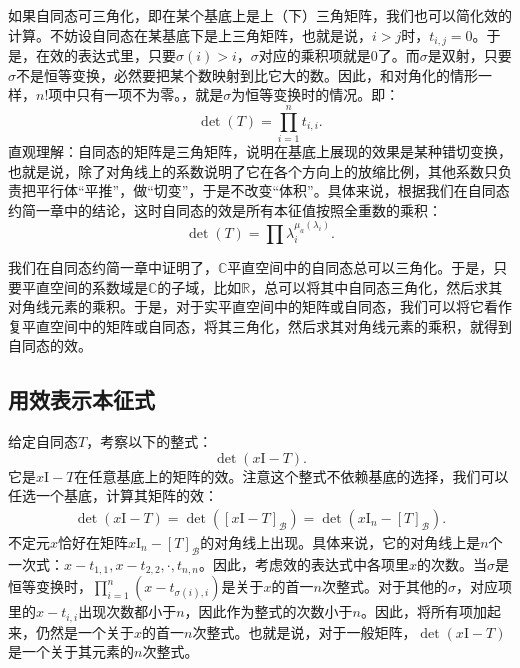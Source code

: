 \documentclass[12pt,UTF8]{ctexbook}
\begin{document}
如果自同态可三角化，即在某个基底上是上（下）三角矩阵，我们也可以简化效的计算。不妨设自同态在某基底下是上三角矩阵，也就是说，$i>j$时，$t_{i,j} = 0$。于是，在效的表达式里，只要$\sigma(i) > i$，$\sigma$对应的乘积项就是$0$了。而$\sigma$是双射，只要$\sigma$不是恒等变换，必然要把某个数映射到比它大的数。因此，和对角化的情形一样，$n!$项中只有一项不为零。，就是$\sigma$为恒等变换时的情况。即：
$$
\det(T) = \prod_{i=1}^n t_{i,i}.
$$
直观理解：自同态的矩阵是三角矩阵，说明在基底上展现的效果是某种错切变换，也就是说，除了对角线上的系数说明了它在各个方向上的放缩比例，其他系数只负责把平行体“平推”，做“切变”，于是不改变“体积”。具体来说，根据我们在自同态约简一章中的结论，这时自同态的效是所有本征值按照全重数的乘积：
$$
\det(T) = \prod\lambda_i^{\mu_a(\lambda_i)}.
$$

我们在自同态约简一章中证明了，$\mathbb{C}$平直空间中的自同态总可以三角化。于是，只要平直空间的系数域是$\mathbb{C}$的子域，比如$\mathbf{\mathbb{R}}$，总可以将其中自同态三角化，然后求其对角线元素的乘积。于是，对于实平直空间中的矩阵或自同态，我们可以将它看作复平直空间中的矩阵或自同态，将其三角化，然后求其对角线元素的乘积，就得到自同态的效。

\subsection{用效表示本征式}
给定自同态$T$，考察以下的整式：
$$
\det(x \mathrm{I} - T).
$$
它是$x \mathrm{I} - T$在任意基底上的矩阵的效。注意这个整式不依赖基底的选择，我们可以任选一个基底，计算其矩阵的效：
\begin{align*}
    \det(x \mathrm{I} - T) = \det([x \mathrm{I} - T]_{\mathcal{B}}) = \det(x\mathrm{I}_n - [T]_{\mathcal{B}}).
\end{align*}
不定元$x$恰好在矩阵$x\mathrm{I}_n - [T]_{\mathcal{B}}$的对角线上出现。具体来说，它的对角线上是$n$个一次式：$x - t_{1,1}, x - t_{2,2}, \cdot, t_{n, n}$。因此，考虑效的表达式中各项里$x$的次数。当$\sigma$是恒等变换时，$\prod_{i=1}^n (x - t_{\sigma(i),i})$是关于$x$的首一$n$次整式。对于其他的$\sigma$，对应项里的$x - t_{i,i}$出现次数都小于$n$，因此作为整式的次数小于$n$。因此，将所有项加起来，仍然是一个关于$x$的首一$n$次整式。也就是说，对于一般矩阵，$\det(x \mathrm{I} - T)$是一个关于其元素的$n$次整式。
\end{document}
